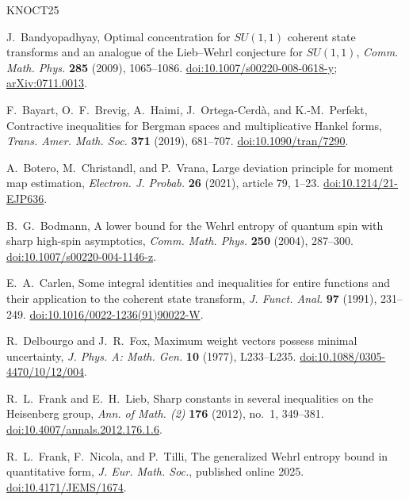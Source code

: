 \documentclass[11pt,reqno]{amsart}
\numberwithin{equation}{section}
\theoremstyle{plain}
\theoremstyle{remark}
\begin{document}
\newcommand{\etalchar}[1]{$^{#1}$}
\begin{thebibliography}{KNOCT25}
\raggedright
\setlength{\baselineskip}{10pt}
\enlargethispage{2\baselineskip}

J.~Bandyopadhyay,
Optimal concentration for $SU(1,1)$ coherent state transforms and an
analogue of the Lieb--Wehrl conjecture for $SU(1,1)$,
\emph{Comm. Math. Phys.} \textbf{285} (2009), 1065--1086.
\href{https://doi.org/10.1007/s00220-008-0618-y}{doi:10.1007/s00220-008-0618-y};
\href{https://arxiv.org/abs/0711.0013}{arXiv:0711.0013}.

\bibitem[BBH{\etalchar{+}}19]{Bayart}
F.~Bayart, O.~F.~Brevig, A.~Haimi, J.~Ortega-Cerd\`a, and K.-M.~Perfekt,
Contractive inequalities for Bergman spaces and multiplicative Hankel forms,
\emph{Trans. Amer. Math. Soc.} \textbf{371} (2019), 681--707.
\href{https://doi.org/10.1090/tran/7290}{doi:10.1090/tran/7290}.

A.~Botero, M.~Christandl, and P.~Vrana,
Large deviation principle for moment map estimation,
\emph{Electron. J. Probab.} \textbf{26} (2021), article 79, 1--23.
\href{https://doi.org/10.1214/21-EJP636}{doi:10.1214/21-EJP636}.

B.~G.~Bodmann,
A lower bound for the Wehrl entropy of quantum spin with sharp high-spin
asymptotics,
\emph{Comm. Math. Phys.} \textbf{250} (2004), 287--300.
\href{https://doi.org/10.1007/s00220-004-1146-z}{doi:10.1007/s00220-004-1146-z}.

E.~A.~Carlen,
Some integral identities and inequalities for entire functions and their
application to the coherent state transform,
\emph{J. Funct. Anal.} \textbf{97} (1991), 231--249.
\href{https://doi.org/10.1016/0022-1236(91)90022-W}{doi:10.1016/0022-1236(91)90022-W}.

R.~Delbourgo and J.~R.~Fox,
Maximum weight vectors possess minimal uncertainty,
\emph{J. Phys. A: Math. Gen.} \textbf{10} (1977), L233--L235.
\href{https://doi.org/10.1088/0305-4470/10/12/004}{doi:10.1088/0305-4470/10/12/004}.

R.~L.~Frank and E.~H.~Lieb,
Sharp constants in several inequalities on the Heisenberg group,
\emph{Ann. of Math. (2)} \textbf{176} (2012), no.~1, 349--381.
\href{https://doi.org/10.4007/annals.2012.176.1.6}
{doi:10.4007/annals.2012.176.1.6}.

R.~L.~Frank, F.~Nicola, and P.~Tilli,
The generalized Wehrl entropy bound in quantitative form,
\emph{J. Eur. Math. Soc.}, published online 2025.
\href{https://doi.org/10.4171/JEMS/1674}{doi:10.4171/JEMS/1674}.


\end{thebibliography}
\end{document}
